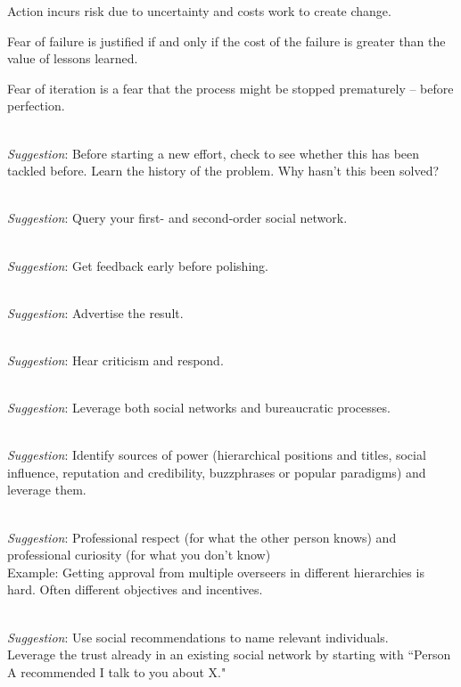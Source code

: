 Action incurs risk due to uncertainty and costs work to create change.

Fear of failure is justified if and only if the cost of the failure is greater than the value of lessons learned.

Fear of iteration is a fear that the process might be stopped prematurely -- before perfection.

\ \\
\textit{Suggestion}: Before starting a new effort, check to see whether this has been tackled before.
%
%
Learn the history of the problem. Why hasn't this been solved?

\ \\
\textit{Suggestion}: Query your first- and second-order social network.

\ \\
\textit{Suggestion}: Get feedback early before polishing.

\ \\
\textit{Suggestion}: Advertise the result.

\ \\
\textit{Suggestion}: Hear criticism and respond.

\ \\
\textit{Suggestion}: Leverage both social networks and bureaucratic processes. 

\ \\
\textit{Suggestion}: Identify sources of power (hierarchical positions and titles, social influence, reputation and credibility, buzzphrases or popular paradigms) and leverage them.

\ \\
\textit{Suggestion}: Professional respect (for what the other person knows) and professional curiosity (for what you don't know) \\
Example: Getting approval from multiple overseers in different hierarchies is hard. Often different objectives and incentives.


\ \\
\textit{Suggestion}: Use social recommendations to name relevant individuals.\\
Leverage the trust already in an existing social network by starting with ``Person A recommended I talk to you about X."


